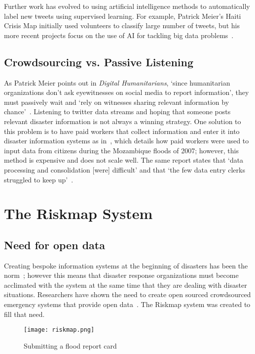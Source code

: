 Further work has evolved to using artificial intelligence methods to
automatically label new tweets using supervised learning. For example, Patrick
Meier's Haiti Crisis Map initially used volunteers to classify large number of
tweets, but his more recent projects focus on the use of AI for tackling big
data problems~\cite{meierDigitalHumanitariansHow2015}.
\subsection{Crowdsourcing vs. Passive Listening} 
As Patrick Meier points out in \textit{Digital Humanitarians}, `since
humanitarian organizations don't ask eyewitnesses on social media to report
information', they must passively wait and `rely on witnesses sharing relevant
information by chance'~\cite{meierDigitalHumanitariansHow2015}. Listening to
twitter data streams and hoping that someone posts relevant disaster information
is not always a winning strategy. One solution to this problem is to have paid
workers that collect information and enter it into disaster information systems
as in~\cite{aminDataNaturalDisasters2008}, which details how paid workers were
used to input data from citizens during the Mozambique floods of 2007; however,
this method is expensive and does not scale well. The same report states that
`data processing and consolidation [were] difficult' and that `the few data
entry clerks struggled to keep up'~\cite{aminDataNaturalDisasters2008}.

\section{The Riskmap System}\label{chap1:riskmap}

	\subsection{Need for open data} Creating bespoke information systems at
	the beginning of disasters has been the
	norm~\cite{aminDataNaturalDisasters2008}; however this means that
	disaster response organizations must become acclimated with the system
	at the same time that they are dealing with disaster situations.
	Researchers have shown the need to create open sourced crowdsourced
	emergency systems that provide open
	data~\cite{avvenutiNeedOpeningCrowdsourced2018a}. The Riskmap system was
	created to fill that need.


	\begin{figure} \texttt{[image: riskmap.png]}
	\caption{Submitting a flood report card}\label{fig:cards} \end{figure}
